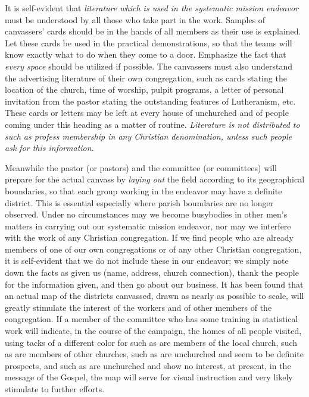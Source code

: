 \documentclass[
]{book}
\begin{document}
It is self-evident that \emph{literature which is used in the systematic mission endeavor} must be understood by all those who take part in the work. Samples of canvassers' cards should be in the hands of all members as their use is explained. Let these cards be used in the practical demonstrations, so that the teams will know exactly what to do when they come to a door. Emphasize the fact that \emph{every space} should be utilized if possible. The canvassers must also understand the advertising literature of their own congregation, such as cards stating the location of the church, time of worship, pulpit programs, a letter of personal invitation from the pastor stating the outstanding features of Lutheranism, etc. These cards or letters may be left at every house of unchurched and of people coming under this heading as a matter of routine. \emph{Literature is not distributed to such as profess membership in any Christian denomination, unless such people ask for this information}.

Meanwhile the pastor (or pastors) and the committee (or committees) will prepare for the actual canvass by \emph{laying out} the field according to its geographical boundaries, so that each group working in the endeavor may have a definite district. This is essential especially where parish boundaries are no longer observed. Under no circumstances may we become busybodies in other men's matters in carrying out our systematic mission endeavor, nor may we interfere with the work of any Christian congregation. If we find people who are already members of one of our own congregations or of any other Christian congregation, it is self-evident that we do not include these in our endeavor; we simply note down the facts as given us (name, address, church connection), thank the people for the information given, and then go about our business. It has been found that an actual map of the districts canvassed, drawn as nearly as possible to scale, will greatly stimulate the interest of the workers and of other members of the congregation. If a member of the committee who has some training in statistical work will indicate, in the course of the campaign, the homes of all people visited, using tacks of a different color for such as are members of the local church, such as are members of other churches, such as are unchurched and seem to be definite prospects, and such as are unchurched and show no interest, at present, in the message of the Gospel, the map will serve for visual instruction and very likely stimulate to further efforts.
\end{document}

